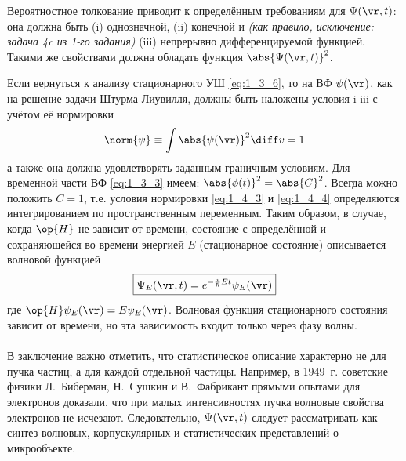 Вероятностное толкование приводит к определённым требованиям для $\Psi(\vr,t)$: она должна быть (i) однозначной, (ii) конечной и \textit{(как правило, исключение: задача 4c из 1-го задания)} (iii) непрерывно дифференцируемой\footnotemark{} функцией. Такими же свойствами должна обладать функция $\abs{\Psi(\vr,t)}^2$.


Если вернуться к анализу стационарного УШ \eqref{eq:1_3_6}, то на ВФ $\psi(\vr)$, как на решение задачи Штурма-Лиувилля, должны быть наложены условия i-iii с учётом её нормировки
\begin{equation}
\label{eq:1_4_4}
\norm{\psi} \equiv \int \abs{\psi(\vr)}^2 \diff v = 1
\end{equation}%
%
а также она должна удовлетворять заданным граничным условиям. Для временной части ВФ \eqref{eq:1_3_3} имеем: $\abs{\phi (t)}^2= \abs{C}^2$. Всегда можно положить $C = 1$, т.е. условия нормировки \eqref{eq:1_4_3} и \eqref{eq:1_4_4} определяются интегрированием по пространственным переменным. Таким образом, в случае, когда $\op{H}$ не зависит от времени, состояние с определённой и сохраняющейся во времени энергией $E$ (стационарное состояние) описывается волновой функцией
$$
\boxed{
  \Psi_E(\vr,t) = e^{-\frac{i}{\hbar}Et} \psi_E(\vr)
}
$$ где $\op{H} \psi_E(\vr) = E\psi_E(\vr)$. Волновая функция стационарного состояния зависит от времени, но эта зависимость входит только через фазу волны.
\\
\\

В заключение важно отметить, что статистическое описание характерно не для пучка частиц, а для каждой отдельной частицы. Например, в 1949~г. советские физики Л.~Биберман, Н.~Сушкин и В.~Фабрикант\footnotemark{} прямыми опытами для электронов доказали, что при малых интенсивностях пучка волновые свойства электронов не исчезают. Следовательно, $\Psi(\vr,t)$ следует рассматривать как синтез волновых, корпускулярных и статистических представлений о микрообъекте.
